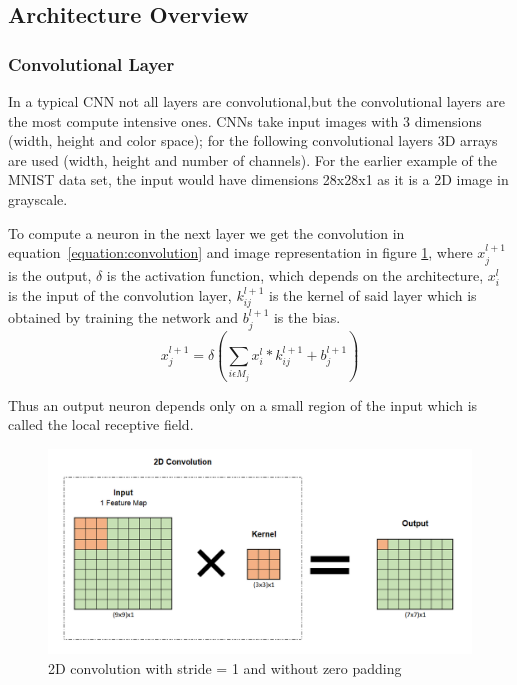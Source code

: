  \subsection{Architecture Overview}
 \label{section:Aoverview}


 \subsubsection{Convolutional Layer}
\label{section:convlayer}

In a typical CNN not all layers are convolutional,but the convolutional layers
are the most compute intensive ones. CNNs take input images with 3 dimensions
(width, height and color space); for the following convolutional layers 3D
arrays are used (width, height and number of channels). For the earlier example
of the MNIST data set, the input would have dimensions 28x28x1 as it is a 2D
image in grayscale.

To compute a neuron in the next layer we get the convolution in
equation~\ref{equation:convolution} and image representation in figure \ref{Cl},
where $x_{j}^{l+1}$ is the output, $\delta$ is the activation function, which
depends on the architecture, $x_{i}^{l}$ is the input of the convolution layer,
$k_{ij}^{l+1}$ is the kernel of said layer which is obtained by training the
network and $b_{j}^{l+1}$ is the bias.
\begin{equation} \label{equation:convolution}
    \displaystyle x_{j}^{l+1}=\delta (\sum_{i \epsilon M_{j}}x_{i}^{l} * k_{ij}^{l+1}+ b_{j}^{l+1})
\end{equation}

Thus an output neuron depends only on a small region of the input which is
called the local receptive field.

\begin{figure}[!htbp]
    \centering
    \includegraphics[width=1\textwidth]{Figures/conv.png}
    \caption{2D convolution with stride = 1 and without zero padding}
    \label{Cl}
\end{figure} 

